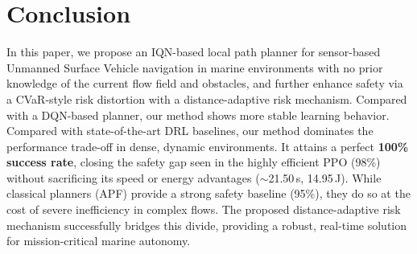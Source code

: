 \section{Conclusion}

In this paper, we propose an IQN-based local path planner for sensor-based Unmanned Surface Vehicle navigation in marine environments with no prior knowledge of the current flow field and obstacles, and further enhance safety via a CVaR-style risk distortion with a distance-adaptive risk mechanism. Compared with a DQN-based planner, our method shows more stable learning behavior.
Compared with state-of-the-art DRL baselines, our method dominates the performance trade-off in dense, dynamic environments. It attains a perfect \textbf{100\% success rate}, closing the safety gap seen in the highly efficient PPO (98\%) without sacrificing its speed or energy advantages ($\sim$21.50\,s, 14.95\,J). While classical planners (APF) provide a strong safety baseline (95\%), they do so at the cost of severe inefficiency in complex flows. The proposed distance-adaptive risk mechanism successfully bridges this divide, providing a robust, real-time solution for mission-critical marine autonomy.

